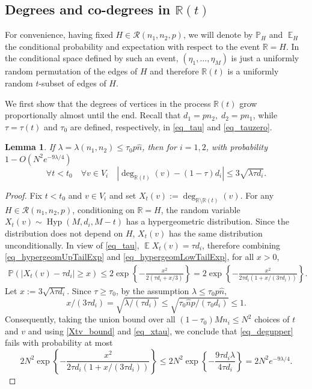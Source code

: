 \documentclass[12pt,reqno]{amsart}
\newcommand{\E}{\operatorname{\mathbb{E}}}
\newcommand{\rc}{{\mathcal{R}}}
\newcommand{\rcnnp}{\rc(n_1,n_2,p)}
\newcommand{\Prob} {\mathbb {P}}
\newcommand{\prob}[1]{\Prob\left(#1\right)}
\newcommand{\R} {\mathbb R}
\newcommand{\Hyp}{\operatorname{Hyp}}
\newtheorem{lemma}[theorem]{Lemma}
\theoremstyle{definition}
\begin{document}
\subsection{Degrees and co-degrees in \texorpdfstring{$\R(t)$}{R(t)}}
\label{ss_Rt_cod}
For convenience, having fixed $H\in\rcnnp$, we will denote by $\Prob_H$ and $\E_H$ the conditional probability and expectation with respect to the event $\R = H$. In the conditional space defined by such an event, $(\eta_1, \dots, \eta_M)$ is just a uniformly random permutation of the edges of $H$ and therefore $\R(t)$ is a uniformly random $t$-subset of edges of $H$.



We first show that the degrees of vertices in the process $\R(t)$ grow proportionally almost until the end.
Recall that $d_1 = pn_2,\; d_2 = pn_1$, while $\tau=\tau(t)$ and $\tau_0$ are defined, respectively, in \eqref{eq_tau} and \eqref{eq_tauzero}.

\begin{lemma}
\label{lem_degrees}
If $\lambda = \lambda(n_1,n_2) \le \tau_0 p \hat n$, then for $i = 1, 2$, with probability $1 - O(N^2e^{-9\lambda/4})$
\begin{equation}
  \forall t < t_0 \quad \forall v \in V_i \quad |\deg_{\R(t)}(v) - (1 - \tau) d_i| \le 3 \sqrt{\lambda \tau d_i}.
\label{eq_degupper}
\end{equation}
\end{lemma}
\begin{proof}
  Fix $t < t_0$ and $v\in V_i$ and set $X_t(v) := \deg_{\R \setminus \R(t)}(v)$. For any $H \in \rcnnp$, conditioning on $\R = H$, the random variable $X_t(v) \sim \Hyp(M, d_i, M - t)$ has a hypergeometric distribution. Since the distribution does not depend on $H$, $X_t(v)$ has the same distribution unconditionally. In view of \eqref{eq_tau}, $\E X_t(v) = \tau d_i$, therefore combining \eqref{eq_hypergeomUpTailExp} and \eqref{eq_hypergeomLowTailExp}, for all $x > 0$,
\begin{multline}
  \label{Xtv_bound}
\prob{|X_t(v) - \tau d_i| \ge x}
\le 2 \exp \left\{ - \frac{x^2}{2\left(\tau d_i  + x/3 \right)} \right\}= 2 \exp \left\{ - \frac{x^2}{2\tau d_i\left(1  + x/(3\tau d_i) \right)} \right\}.
\end{multline}
Let $x := 3\sqrt{\lambda\tau d_i}$. Since $\tau \ge \tau_0$, by the assumption $\lambda\le \tau_0 p\hat n $,
\begin{equation}
	\label{eq_xtau}
	x/(3\tau d_i) = \sqrt{\lambda/(\tau d_i)} \le  \sqrt{\tau_0 \hat n p/(\tau_0 d_i)} \le 1.
\end{equation}
Consequently, taking the union bound over all $(1 - \tau_0)Mn_i \le N^2$ choices of $t$ and $v$ and using \eqref{Xtv_bound} and \eqref{eq_xtau},
we conclude that  \eqref{eq_degupper} fails with probability at most
\begin{equation*}
2N^2\exp \left\{ - \frac{x^2}{2\tau d_i\left(1  + x/(3\tau d_i) \right)} \right\}
\le 2N^2\exp \left\{ -\frac{9 \tau d_i \lambda}{4\tau d_i} \right\} = 2N^2e^{-9\lambda/4}.
\end{equation*}
\end{proof}
\end{document}

